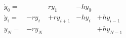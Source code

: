 \documentclass{article}
\begin{document}


\begin{equation}
\begin{array} {rllll}
\dot y_0 = && r y_1 &- h y_0&  \\ 
\dot y_i = &-r y_i& + r y_{i+1}& - h y_i &+ h y_{i-1}  \\
\dot y_N = &-r y_N& & &+ h y_{N-1}  \\
\end{array}
\end{equation}
\end{document}
